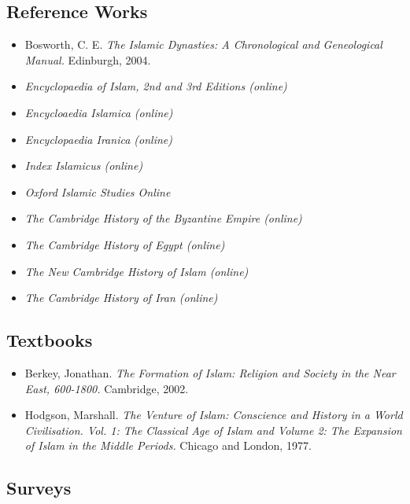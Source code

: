 \documentclass[
]{book}
\providecommand{\tightlist}{%
  \setlength{\itemsep}{0pt}\setlength{\parskip}{0pt}}
\begin{document}
\hypertarget{reference-works}{%
\subsection*{Reference Works}\label{reference-works}}

\begin{itemize}
\tightlist
\item
  Bosworth, C. E. \emph{The Islamic Dynasties: A Chronological and Geneological Manual.} Edinburgh, 2004.
\item
  \emph{Encyclopaedia of Islam, 2nd and 3rd Editions (online)}
\item
  \emph{Encycloaedia Islamica (online)}
\item
  \emph{Encyclopaedia Iranica (online)}
\item
  \emph{Index Islamicus (online)}
\item
  \emph{Oxford Islamic Studies Online}
\item
  \emph{The Cambridge History of the Byzantine Empire (online)}
\item
  \emph{The Cambridge History of Egypt (online)}
\item
  \emph{The New Cambridge History of Islam (online)}
\item
  \emph{The Cambridge History of Iran (online)}
\end{itemize}

\hypertarget{textbooks}{%
\subsection*{Textbooks}\label{textbooks}}

\begin{itemize}
\tightlist
\item
  Berkey, Jonathan. \emph{The Formation of Islam: Religion and Society in the Near East, 600-1800.} Cambridge, 2002.
\item
  Hodgson, Marshall. \emph{The Venture of Islam: Conscience and History in a World Civilisation. Vol. 1: The Classical Age of Islam and Volume 2: The Expansion of Islam in the Middle Periods.} Chicago and London, 1977.
\end{itemize}

\hypertarget{surveys}{%
\subsection*{Surveys}\label{surveys}}
\end{document}
